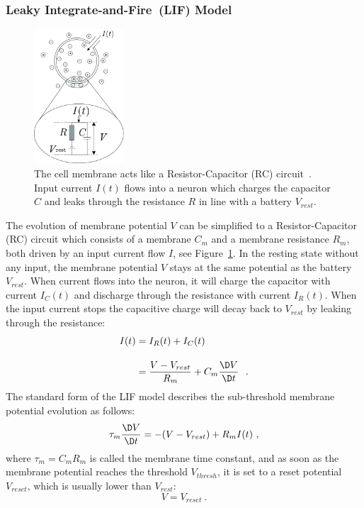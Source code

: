 \subsubsection{Leaky Integrate-and-Fire~(LIF) Model}

\begin{figure}[tb!]
	\centering
	\includegraphics[width=0.3\textwidth]{pics_snn/RC.png}
	\caption[The cell membrane acts like a RC circuit~\citep{gerstner2014neuronal}.]
	{The cell membrane acts like a Resistor-Capacitor (RC) circuit~\citep{gerstner2014neuronal}.
	Input current $I(t)$ flows into a neuron which charges the capacitor $C$ and leaks through the resistance $R$ in line with a battery $V_{rest}$.}
	\label{Fig:rc}
\end{figure}

The evolution of membrane potential $V$ can be simplified to a Resistor-Capacitor (RC) circuit which consists of a membrane \DIFdelbegin {}\DIFdelend \DIFaddbegin {}\DIFaddend $C_m$ and a membrane resistance $R_m$, both driven by an input current flow $I$, see Figure~\ref{Fig:rc}.
In the resting state without any input, the membrane potential $V$ stays at the same potential as the battery $V_{rest}$.
When current flows into the neuron, it will charge the capacitor with current $I_C(t)$ and discharge through the resistance with current $I_R(t)$.
When the input current stops the capacitive charge will decay back to $V_{rest}$ by leaking through the resistance:
\begin{equation}
\begin{aligned}
	I(t) &= I_R(t) + I_C(t) \\[10pt]
	&= \dfrac{V-V_{rest}}{R_m} + C_m \dfrac{\D V}{\D t}~~.
\end{aligned}
\label{equ:LIF_current}
\end{equation}
The standard form of the LIF model describes the sub-threshold membrane potential evolution as follows:
\begin{equation}
	\tau_m \dfrac{\D V}{\D t} = -(V-V_{rest}) + R_m I(t)~,
\end{equation}
where $\tau_m = C_m R_m$ is called the membrane time constant, and as soon as the membrane potential reaches the threshold $V_{thresh}$, it is set to a reset potential $V_{reset}$, which is usually lower than $V_{rest}$: 
\begin{equation}
V = V_{reset}~.
\end{equation}

